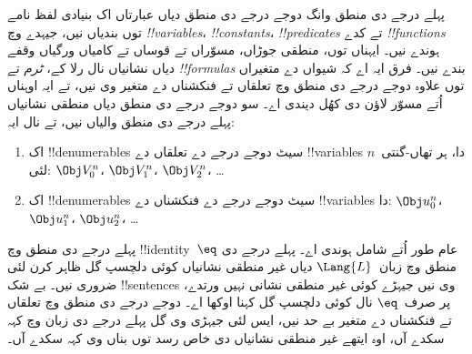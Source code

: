 \documentclass[../../../include/open-logic-section]{subfiles}
\begin{document}


پہلے درجے دی منطق وانگ دوجے درجے دی منطق دیاں عبارتاں اک بنیادی لفظ نامے توں بندیاں نیں، جیہدے وچ \emph{!!{variable}s}، \emph{!!{constant}s}، \emph{!!{predicate}s} تے کدے \emph{!!{function}s} ہوندے نیں۔ ایہناں توں، منطقی جوڑاں، مسوّراں تے قوساں تے کامیاں ورگیاں وقفے دیاں نشانیاں نال رلا کے، \emph{ٹرم} تے \emph{!!{formula}s} بندے نیں۔ فرق ایہ اے کہ شیواں دے متغیراں توں علاوہ دوجے درجے دی منطق وچ تعلقاں تے فنکشناں دے متغیر وی نیں، تے ایہ اوہناں اُتے مسوّر لاؤن دی کھُل دیندی اے۔ سو دوجے درجے دی منطق دیاں منطقی نشانیاں پہلے درجے دی منطق والیاں نیں، تے نال ایہ:

\begin{enumerate}
\item اک !!{denumerable}s سیٹ دوجے درجے دے تعلقاں دے !!{variable}s دا، ہر تھاں-گنتی~$n$ لئی: $\Obj V_0^n$، $\Obj V_1^n$، $\Obj V_2^n$، \dots
\item اک !!{denumerable}s سیٹ دوجے درجے دے فنکشناں دے !!{variable}s دا:
  $\Obj u_0^n$، $\Obj u_1^n$، $\Obj u_2^n$، \dots
\end{enumerate}

پہلے درجے دی منطق وچ !!{identity}~$\eq$ عام طور اُتے شامل ہوندی اے۔ پہلے درجے دی منطق وچ زبان~$\Lang{L}$ دیاں غیر منطقی نشانیاں کوئی دلچسپ گل ظاہر کرن لئی ضروری نیں۔ بے شک !!{sentences} وی نیں جیہڑے کوئی غیر منطقی نشانی نہیں ورتدے، پر صرف~$\eq$ نال کوئی دلچسپ گل کہنا اوکھا اے۔ دوجے درجے دی منطق وچ تعلقاں تے فنکشناں دے متغیر بے حد نیں، ایس لئی جیہڑی وی گل پہلے درجے دی زبان وچ کہہ سکدے آں، اوہ ایتھے غیر منطقی نشانیاں دی خاص رسد توں بناں وی کہہ سکدے آں۔
\end{document}
